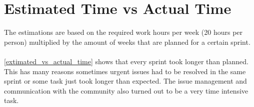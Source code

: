 \section{Estimated Time vs Actual Time}
\noindent\begin{minipage}[t]{0.62\linewidth}
    \vspace{0pt}
    The estimations are based on the required work hours per week (20 hours per person) multiplied by the amount of weeks that are planned for a certain sprint.\\\\ \autoref{extimated_vs_actual_time} shows that every sprint took longer than planned. This has many reasons sometimes urgent issues had to be resolved in the same sprint or some task just took longer than expected. The issue management and communication with the community also turned out to be a very time intensive task.
\end{minipage}
\hfill
\begin{minipage}[t]{0.34\linewidth}
    \vspace{-18pt}
    \begin{table}[H]
    \centering
        \caption{Estimated vs actual time for different sprints}
        \label{extimated_vs_actual_time}
    \end{table}
\end{minipage}

